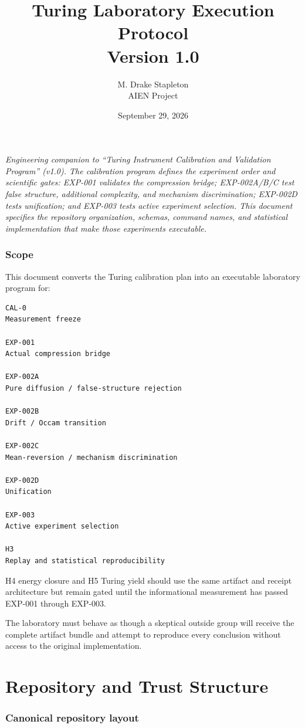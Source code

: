 \documentclass[11pt]{article}
\title{Turing Laboratory Execution Protocol\\
Version 1.0}
\author{M. Drake Stapleton\\AIEN Project}
\date{September 29, 2026}
\begin{document}
\maketitle

\noindent\textit{Engineering companion to ``Turing Instrument Calibration and Validation Program'' (v1.0). The calibration program defines the experiment order and scientific gates: EXP-001 validates the compression bridge; EXP-002A/B/C test false structure, additional complexity, and mechanism discrimination; EXP-002D tests unification; and EXP-003 tests active experiment selection. This document specifies the repository organization, schemas, command names, and statistical implementation that make those experiments executable.}

\section*{Scope}

This document converts the Turing calibration plan into an executable laboratory program for:
\begin{verbatim}
CAL-0
Measurement freeze

EXP-001
Actual compression bridge

EXP-002A
Pure diffusion / false-structure rejection

EXP-002B
Drift / Occam transition

EXP-002C
Mean-reversion / mechanism discrimination

EXP-002D
Unification

EXP-003
Active experiment selection

H3
Replay and statistical reproducibility
\end{verbatim}
H4 energy closure and H5 Turing yield should use the same artifact and receipt architecture but remain gated until the informational measurement has passed EXP-001 through EXP-003.

The laboratory must behave as though a skeptical outside group will receive the complete artifact bundle and attempt to reproduce every conclusion without access to the original implementation.

\part{Repository and Trust Structure}

\section{Canonical repository layout}
\end{document}
